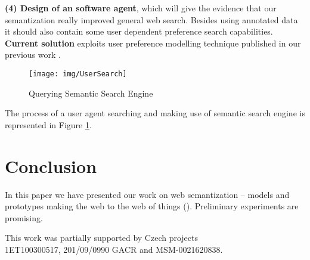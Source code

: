 \documentclass{sig-alternate}
\begin{document}

\textbf{(4) Design of an software agent}, which will give the evidence that our semantization really improved general web search. Besides using annotated data it should also contain some user dependent preference search capabilities. %
{\bf Current solution} exploits user preference modelling technique published in our previous work \cite{biblio:EcHoLearningdifferent2007}.



\begin{figure}
\centering
\texttt{[image: img/UserSearch]}
\caption{Querying Semantic Search Engine}
\label{img:UserSearch}
\end{figure}
 
The process of a user agent searching and making use of semantic search engine is represented in Figure \ref{img:UserSearch}.





\section{Conclusion}
In this paper we have presented our work on web semantization -- models and prototypes making the web to the web of things (\cite{biblio:LeeWebThings}). Preliminary experiments are promising.

This work was partially supported by Czech projects\\1ET100300517, 201/09/0990 GACR and MSM-0021620838.

%



\balancecolumns %
\end{document}
